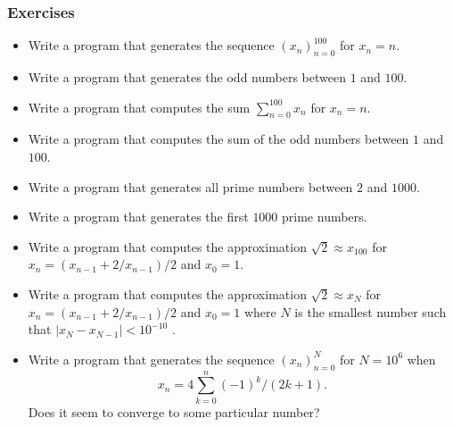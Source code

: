 
\begin{frame}
  \frametitle{Exercises}

  \footnotesize
  \begin{itemize}
    \item
      Write a program that generates the sequence $(x_n)_{n=0}^{100}$ for
      $x_n = n$.
    \item
      Write a program that generates the odd numbers between $1$ and $100$.
    \item
      Write a program that computes the sum $\sum_{n=0}^{100} x_n$ for
      $x_n = n$.
    \item
      Write a program that computes the sum of the odd numbers between $1$
      and $100$.
    \item
      Write a program that generates all prime numbers between $2$ and $1000$.
    \item
      Write a program that generates the first $1000$ prime numbers.
    \item
      Write a program that computes the approximation $\sqrt{2} \approx
      x_{100}$ for $x_{n} = (x_{n-1} + 2/x_{n-1}) / 2$ and $x_0 = 1$.
    \item
      Write a program that computes the approximation $\sqrt{2} \approx
      x_{N}$ for $x_{n} = (x_{n-1} + 2/x_{n-1}) / 2$ and $x_0 = 1$ where $N$
      is the smallest number such that $|x_{N} - x_{N-1}| < 10^{-10}$ .
    \item
      Write a program that generates the sequence $(x_n)_{n=0}^{N}$
      for $N = 10^6$ when
      \begin{equation}
        x_n = 4 \sum_{k=0}^n (-1)^k / (2k + 1).
      \end{equation}
      Does it seem to converge to some particular number?
    \end{itemize}

\end{frame}
